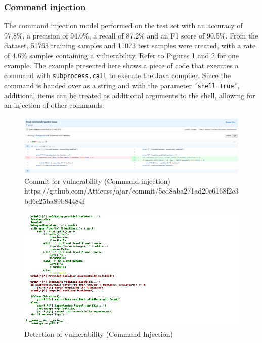 \documentclass[
a4paper,
pagesize,
pdftex,
12pt,
ngerman,
fleqn,
final,
]{scrartcl}
\begin{document}
	\newpage
	\subsubsection{Command injection}
	The command injection model performed on the test set with an accuracy of 97.8\%, a precision of 94.0\%, a recall of 87.2\% and an F1 score of 90.5\%. From the dataset, 51763 training samples and 11073 test samples were created, with a rate of 4.6\% samples containing a vulnerability. Refer to Figures \ref{fig:command_injectionB} and \ref{fig:command_injectionBr} for one example. The example presented here shows a piece of code that executes a command with \texttt{subprocess.call} to execute the Java compiler. Since the command is handed over as a string and with the parameter \texttt{'shell=True'}, additional items can be treated as additional arguments to the shell, allowing for an injection of other commands.
	
	
	\begin{figure}[H]
		\centering
		\includegraphics[width=\linewidth]{Images/command_injectionB}
		\caption{Commit for vulnerability (Command injection) \newline \scriptsize{https://github.com/Atticuss/ajar/commit/5ed8aba271ad20e6168f2e3bd6c25ba89b84484f}}
		\label{fig:command_injectionB}
	\end{figure}
	\begin{figure}[H]
		\centering
		\includegraphics[width=\linewidth]{Images/command_injectionBr}
		\caption{Detection of vulnerability (Command Injection)}
		\label{fig:command_injectionBr}
	\end{figure}
	
\end{document}
